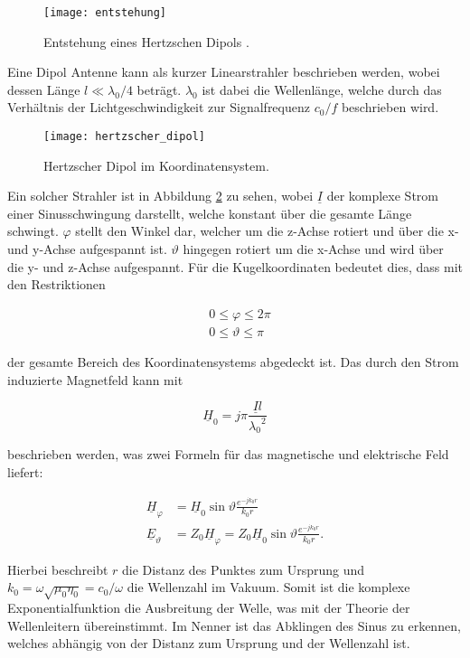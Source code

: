 \begin{figure}[H]
	\centering
	\texttt{[image: entstehung]}
	\caption{Entstehung eines Hertzschen Dipols \cite{web2}.}\label{fig:entstehung}
\end{figure}

Eine Dipol Antenne kann als kurzer Linearstrahler beschrieben werden, wobei dessen Länge $l \ll \lambda_0 /4$ beträgt. $\lambda_0$ ist dabei die Wellenlänge, welche durch das Verhältnis der Lichtgeschwindigkeit zur Signalfrequenz $c_0/f$ beschrieben wird. 

\begin{figure}[H]
	\centering
	\texttt{[image: hertzscher\_dipol]}
	\caption{Hertzscher Dipol im Koordinatensystem.}\label{fig:hertzsche Dipol}
\end{figure}

Ein solcher Strahler ist in Abbildung \ref{fig:hertzsche Dipol} zu sehen, wobei $\underline{I}$ der komplexe Strom einer Sinusschwingung darstellt, welche konstant über die gesamte Länge schwingt. $\varphi$ stellt den Winkel dar, welcher um die z-Achse rotiert und über die x- und y-Achse aufgespannt ist. $\vartheta$ hingegen rotiert um die x-Achse und wird über die y- und z-Achse aufgespannt. Für die Kugelkoordinaten bedeutet dies, dass mit den Restriktionen 

\begin{align}
&0 \leq \varphi \leq 2\pi\\
&0 \leq \vartheta \leq \pi \label{eq:HertzTheta}
\end{align}

der gesamte Bereich des Koordinatensystems abgedeckt ist. Das durch den Strom induzierte Magnetfeld kann mit 

\begin{equation}
\underline{H}_0 = j\pi \frac{\underline{I}l}{{\lambda_0}^2}
\end{equation}

beschrieben werden, was zwei Formeln für das magnetische und elektrische Feld liefert:

\begin{align}
\underline{H}_\varphi   &= \underline{H}_0 \sin \vartheta \frac{e^{-jk_0r}}{k_0r}\\
\underline{E}_\vartheta &= Z_0 \underline{H}_\varphi = Z_0 \underline{H}_0 \sin \vartheta \frac{e^{-jk_0r}}{k_0r}.\label{eq:HertzE}
\end{align}

Hierbei beschreibt $r$ die Distanz des Punktes zum Ursprung und $k_0 = \omega \sqrt{\mu_0 \eta_0} = c_0/\omega$ die Wellenzahl im Vakuum. Somit ist die komplexe Exponentialfunktion die Ausbreitung der Welle, was mit der Theorie der Wellenleitern übereinstimmt. Im Nenner ist das Abklingen des Sinus zu erkennen, welches abhängig von der Distanz zum Ursprung und der Wellenzahl ist.

